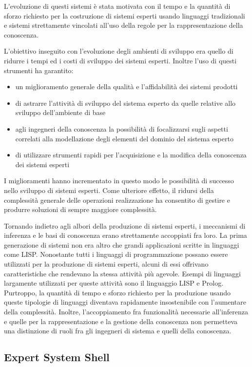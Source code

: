 L'evoluzione di questi sistemi è stata motivata con il tempo e la quantità di sforzo richiesto per la costruzione di sistemi esperti usando linguaggi tradizionali e sistemi strettamente vincolati all'uso della regole per la rappresentazione della conoscenza.

L'obiettivo inseguito con l'evoluzione degli ambienti di sviluppo era quello di ridurre i tempi ed i costi di sviluppo dei sistemi esperti. Inoltre l'uso di questi strumenti ha garantito:
\begin{itemize}
	\item un miglioramento generale della qualità e l'affidabilità dei sistemi prodotti
	\item di astrarre l'attività di sviluppo del sistema esperto da quelle relative allo sviluppo dell'ambiente di base
	\item agli ingegneri della conoscenza la possibilità di focalizzarsi sugli aspetti correlati alla modellazione degli elementi del dominio del sistema esperto
	\item di utilizzare strumenti rapidi per l'acquisizione e la modifica della conoscenza dei sistemi esperti
\end{itemize}

I miglioramenti hanno incrementato in questo modo le possibilità di successo nello sviluppo di sistemi esperti. Come ulteriore effetto, il ridursi della complessità generale delle operazioni realizzazione ha consentito di gestire e produrre soluzioni di sempre maggiore complessità.

Tornando indietro agli albori della produzione di sistemi esperti, i meccanismi di inferenza e le basi di conoscenza erano strettamente accoppiati fra loro. La prima generazione di sistemi non era altro che grandi applicazioni scritte in linguaggi come LISP. Nonostante tutti i linguaggi di programmazione possano essere utilizzati per la produzione di sistemi esperti, alcuni di essi offrivano caratteristiche che rendevano la stessa attività più agevole. Esempi di linguaggi largamente utilizzati per queste attività sono il linguaggio LISP e Prolog. Purtroppo, la quantità di tempo e sforzo richiesto per la produzione usando queste tipologie di linguaggi diventava rapidamente insostenibile con l'aumentare della complessità. Inoltre, l'accoppiamento fra funzionalità necessarie all'inferenza e quelle per la rappresentazione e la gestione della conoscenza non permetteva una distinzione di ruoli fra gli ingegneri di sistema e quelli della conoscenza.

\subsection{Expert System Shell}

